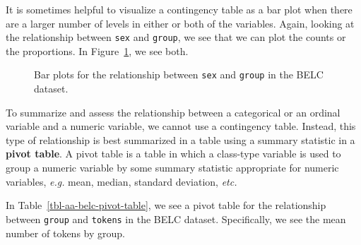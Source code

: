 \documentclass[
  letterpaper,
  DIV=11,
  numbers=noendperiod]{scrreport}
\theoremstyle{definition}
\theoremstyle{remark}
\begin{document}
It is sometimes helpful to visualize a contingency table as a bar plot
when there are a larger number of levels in either or both of the
variables. Again, looking at the relationship between \texttt{sex} and
\texttt{group}, we see that we can plot the counts or the proportions.
In Figure~\ref{fig-aa-belc-bar-plots}, we see both.

\begin{figure}

\begin{minipage}[t]{0.50\linewidth}

{\centering 


}

\end{minipage}%
%
\begin{minipage}[t]{0.50\linewidth}

{\centering 


}

\end{minipage}%

\caption{\label{fig-aa-belc-bar-plots}Bar plots for the relationship
between \texttt{sex} and \texttt{group} in the BELC dataset.}

\end{figure}

To summarize and assess the relationship between a categorical or an
ordinal variable and a numeric variable, we cannot use a contingency
table. Instead, this type of relationship is best summarized in a table
using a summary statistic in a \textbf{pivot table}. A pivot table is a
table in which a class-type variable is used to group a numeric variable
by some summary statistic appropriate for numeric variables, \emph{e.g.}
mean, median, standard deviation, \emph{etc.}

In Table~\ref{tbl-aa-belc-pivot-table}, we see a pivot table for the
relationship between \texttt{group} and \texttt{tokens} in the BELC
dataset. Specifically, we see the mean number of tokens by group.
\end{document}
